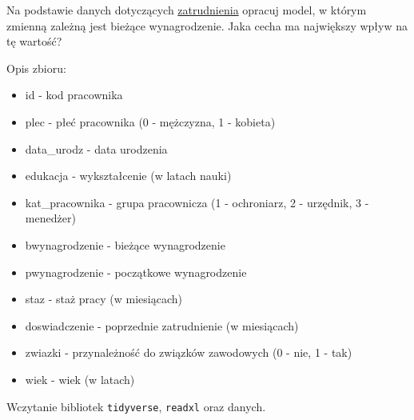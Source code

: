\documentclass[]{book}
\newenvironment{Shaded}{\begin{snugshade}}{\end{snugshade}}
\newcommand{\KeywordTok}[1]{\textcolor[rgb]{0.13,0.29,0.53}{\textbf{#1}}}
\newcommand{\DataTypeTok}[1]{\textcolor[rgb]{0.13,0.29,0.53}{#1}}
\newcommand{\DecValTok}[1]{\textcolor[rgb]{0.00,0.00,0.81}{#1}}
\newcommand{\StringTok}[1]{\textcolor[rgb]{0.31,0.60,0.02}{#1}}
\newcommand{\OperatorTok}[1]{\textcolor[rgb]{0.81,0.36,0.00}{\textbf{#1}}}
\newcommand{\NormalTok}[1]{#1}
\providecommand{\tightlist}{%
  \setlength{\itemsep}{0pt}\setlength{\parskip}{0pt}}
\begin{document}
Na podstawie danych dotyczących
\href{data/pracownicy.xlsx}{zatrudnienia} opracuj model, w którym
zmienną zależną jest bieżące wynagrodzenie. Jaka cecha ma największy
wpływ na tę wartość?

Opis zbioru:

\begin{itemize}
\tightlist
\item
  id - kod pracownika
\item
  plec - płeć pracownika (0 - mężczyzna, 1 - kobieta)
\item
  data\_urodz - data urodzenia
\item
  edukacja - wykształcenie (w latach nauki)
\item
  kat\_pracownika - grupa pracownicza (1 - ochroniarz, 2 - urzędnik, 3 -
  menedżer)
\item
  bwynagrodzenie - bieżące wynagrodzenie
\item
  pwynagrodzenie - początkowe wynagrodzenie
\item
  staz - staż pracy (w miesiącach)
\item
  doswiadczenie - poprzednie zatrudnienie (w miesiącach)
\item
  zwiazki - przynależność do związków zawodowych (0 - nie, 1 - tak)
\item
  wiek - wiek (w latach)
\end{itemize}

Wczytanie bibliotek \texttt{tidyverse}, \texttt{readxl} oraz danych.

\begin{Shaded}
\end{Shaded}
\end{document}
